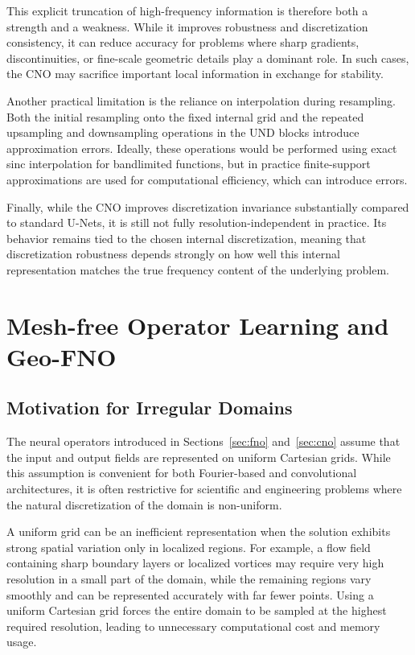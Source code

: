 This explicit truncation of high-frequency information is therefore both a strength and a weakness. While it improves robustness and discretization consistency, it can reduce accuracy for problems where sharp gradients, discontinuities, or fine-scale geometric details play a dominant role. In such cases, the CNO may sacrifice important local information in exchange for stability.

Another practical limitation is the reliance on interpolation during resampling. Both the initial resampling onto the fixed internal grid and the repeated upsampling and downsampling operations in the UND blocks introduce approximation errors. Ideally, these operations would be performed using exact sinc interpolation for bandlimited functions, but in practice finite-support approximations are used for computational efficiency, which can introduce errors.

Finally, while the CNO improves discretization invariance substantially compared to standard U-Nets, it is still not fully resolution-independent in practice. Its behavior remains tied to the chosen internal discretization, meaning that discretization robustness depends strongly on how well this internal representation matches the true frequency content of the underlying problem.


\section{Mesh-free Operator Learning and Geo-FNO}

\subsection{Motivation for Irregular Domains}

The neural operators introduced in Sections~\ref{sec:fno} and~\ref{sec:cno} assume that the input and output fields are represented on uniform Cartesian grids. While this assumption is convenient for both Fourier-based and convolutional architectures, it is often restrictive for scientific and engineering problems where the natural discretization of the domain is non-uniform.

A uniform grid can be an inefficient representation when the solution exhibits strong spatial variation only in localized regions. For example, a flow field containing sharp boundary layers or localized vortices may require very high resolution in a small part of the domain, while the remaining regions vary smoothly and can be represented accurately with far fewer points. Using a uniform Cartesian grid forces the entire domain to be sampled at the highest required resolution, leading to unnecessary computational cost and memory usage.

